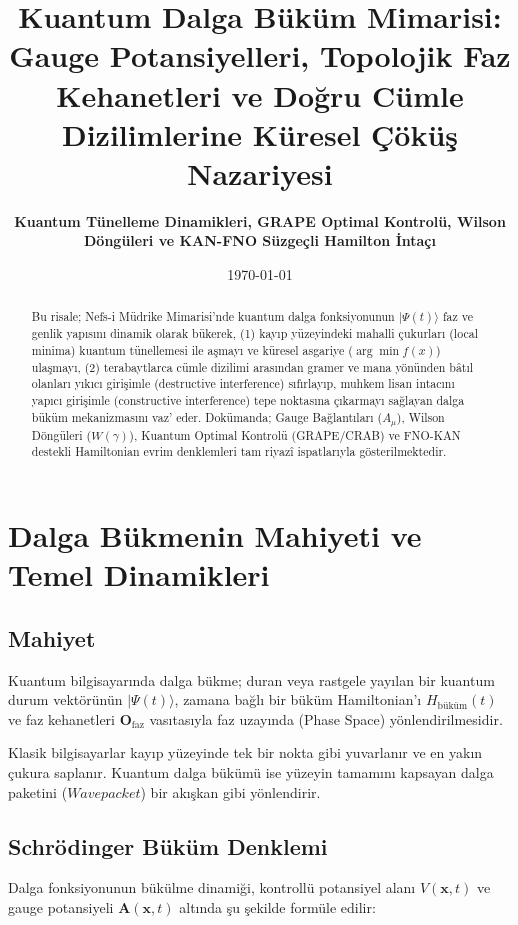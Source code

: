 \documentclass[11pt, a4paper]{article}
\title{\textbf{Kuantum Dalga Büküm Mimarisi: Gauge Potansiyelleri, Topolojik Faz Kehanetleri ve Doğru Cümle Dizilimlerine Küresel Çöküş Nazariyesi}}
\author{\textbf{Kuantum Tünelleme Dinamikleri, GRAPE Optimal Kontrolü, Wilson Döngüleri ve KAN-FNO Süzgeçli Hamilton İntaçı}}
\date{\today}
\begin{document}
\maketitle

\begin{abstract}
Bu risale; Nefs-i Müdrike Mimarisi'nde kuantum dalga fonksiyonunun $|\Psi(t)\rangle$ faz ve genlik yapısını dinamik olarak bükerek, (1) kayıp yüzeyindeki mahalli çukurları (local minima) kuantum tünellemesi ile aşmayı ve küresel asgariye ($\arg\min f(x)$) ulaşmayı, (2) terabaytlarca cümle dizilimi arasından gramer ve mana yönünden bâtıl olanları yıkıcı girişimle (destructive interference) sıfırlayıp, muhkem lisan intacını yapıcı girişimle (constructive interference) tepe noktasına çıkarmayı sağlayan dalga büküm mekanizmasını vaz' eder. Dokümanda; Gauge Bağlantıları ($A_\mu$), Wilson Döngüleri ($W(\gamma)$), Kuantum Optimal Kontrolü (GRAPE/CRAB) ve FNO-KAN destekli Hamiltonian evrim denklemleri tam riyazî ispatlarıyla gösterilmektedir.
\end{abstract}

\tableofcontents
\newpage

\section{Dalga Bükmenin Mahiyeti ve Temel Dinamikleri}

\subsection{Mahiyet}
Kuantum bilgisayarında dalga bükme; duran veya rastgele yayılan bir kuantum durum vektörünün $|\Psi(t)\rangle$, zamana bağlı bir büküm Hamiltonian'ı $H_{\text{büküm}}(t)$ ve faz kehanetleri $\mathbf{O}_{\text{faz}}$ vasıtasıyla faz uzayında (Phase Space) yönlendirilmesidir.

Klasik bilgisayarlar kayıp yüzeyinde tek bir nokta gibi yuvarlanır ve en yakın çukura saplanır. Kuantum dalga bükümü ise yüzeyin tamamını kapsayan dalga paketini ($Wavepacket$) bir akışkan gibi yönlendirir.

\subsection{Schrödinger Büküm Denklemi}
Dalga fonksiyonunun bükülme dinamiği, kontrollü potansiyel alanı $V(\mathbf{x}, t)$ ve gauge potansiyeli $\mathbf{A}(\mathbf{x}, t)$ altında şu şekilde formüle edilir:
\end{document}
